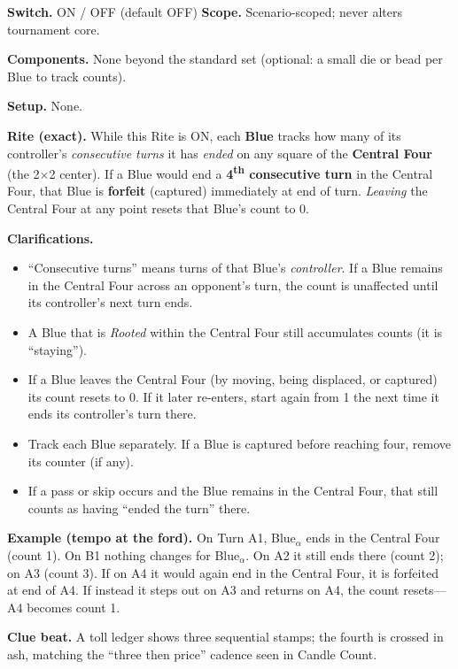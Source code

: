 \documentclass[11pt]{article}
\numberwithin{equation}{section} %
\theoremstyle{plain} %
\theoremstyle{definition} %
\theoremstyle{remark} %
\begin{document}
\medskip
\noindent\textbf{Switch.} \textsc{ON / OFF} (default \textsc{OFF}) \hfill \textbf{Scope.} Scenario-scoped; never alters tournament core.

\medskip
\noindent\textbf{Components.} None beyond the standard set (optional: a small die or bead per Blue to track counts).

\medskip
\noindent\textbf{Setup.} None.

\medskip
\noindent\textbf{Rite (exact).} While this Rite is \textsc{ON}, each \textbf{Blue} tracks how many of its controller’s \emph{consecutive turns} it has \emph{ended} on any square of the \textbf{Central Four} (the 2\(\times\)2 center). If a Blue would end a \textbf{4\textsuperscript{th} consecutive turn} in the Central Four, that Blue is \textbf{forfeit} (captured) immediately at end of turn. \emph{Leaving} the Central Four at any point resets that Blue’s count to 0.

\medskip
\noindent\textbf{Clarifications.}
\begin{itemize}\setlength\itemsep{0.25em}
  \item “Consecutive turns” means turns of that Blue’s \emph{controller}. If a Blue remains in the Central Four across an opponent’s turn, the count is unaffected until its controller’s next turn ends.
  \item A Blue that is \emph{Rooted} within the Central Four still accumulates counts (it is “staying”).
  \item If a Blue leaves the Central Four (by moving, being displaced, or captured) its count resets to 0. If it later re-enters, start again from 1 the next time it ends its controller’s turn there.
  \item Track each Blue separately. If a Blue is captured before reaching four, remove its counter (if any).
  \item If a pass or skip occurs and the Blue remains in the Central Four, that still counts as having “ended the turn” there.
\end{itemize}

\medskip
\noindent\textbf{Example (tempo at the ford).}  
On Turn A1, Blue\(_\alpha\) ends in the Central Four (count 1). On B1 nothing changes for Blue\(_\alpha\). On A2 it still ends there (count 2); on A3 (count 3). If on A4 it would again end in the Central Four, it is forfeited at end of A4. If instead it steps out on A3 and returns on A4, the count resets—A4 becomes count 1.

\medskip
\noindent\textbf{Clue beat.} A toll ledger shows three sequential stamps; the fourth is crossed in ash, matching the “three then price” cadence seen in Candle Count.
\end{document}
